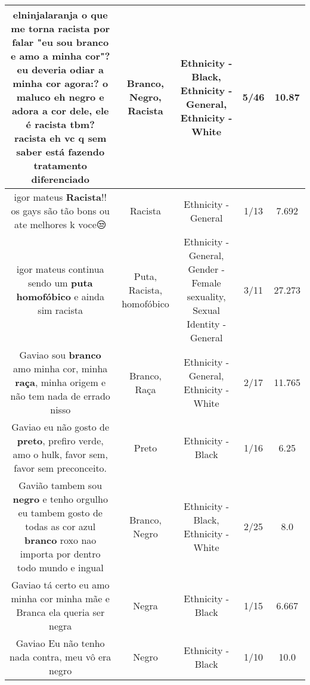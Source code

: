 \documentclass[11pt]{article}
\newlength\mylength
\begin{document}
\begin{center}
\begin{longtable}{|C{.65\mylength}|C{.30\mylength}|C{.12\mylength}|C{.12\mylength}|C{.12\mylength}|}
  \small elninjalaranja o que me torna \textbf{racista} por falar  "eu sou \textbf{branco} e amo a minha cor"? eu deveria odiar a minha cor agora:? o maluco eh \textbf{negro} e adora a cor dele, ele é \textbf{racista} tbm? \textbf{racista} eh vc q sem saber está fazendo tratamento diferenciado\normalsize   & Branco, Negro, Racista & Ethnicity - Black, Ethnicity - General, Ethnicity - White & 5/46 & 10.87 \\  \hline
  \small igor mateus  \textbf{Racista}!! os gays são tão bons ou ate melhores k voce😒\normalsize   & Racista & Ethnicity - General & 1/13 & 7.692 \\  \hline
  \small igor mateus continua sendo um \textbf{puta} \textbf{homofóbico} e ainda sim racista\normalsize   & Puta, Racista, homofóbico & Ethnicity - General, Gender - Female sexuality, Sexual Identity - General & 3/11 & 27.273 \\  \hline
  \small Gaviao sou \textbf{branco} amo minha cor, minha \textbf{raça}, minha origem e não tem nada de errado nisso\normalsize   & Branco, Raça & Ethnicity - General, Ethnicity - White & 2/17 & 11.765 \\  \hline
  \small Gaviao eu não gosto de \textbf{preto}, prefiro verde, amo o hulk, favor sem, favor sem preconceito.\normalsize   & Preto & Ethnicity - Black & 1/16 & 6.25 \\  \hline
  \small Gavião tambem sou \textbf{negro} e tenho orgulho eu tambem gosto de todas as cor azul \textbf{branco} roxo nao importa por dentro todo mundo e ingual\normalsize   & Branco, Negro & Ethnicity - Black, Ethnicity - White & 2/25 & 8.0 \\  \hline
  \small Gaviao tá certo eu amo minha cor minha mãe e Branca ela queria ser negra\normalsize   & Negra & Ethnicity - Black & 1/15 & 6.667 \\  \hline
  \small Gaviao Eu não tenho nada contra, meu vô era negro\normalsize   & Negro & Ethnicity - Black & 1/10 & 10.0 \\  \hline

\end{longtable}
\end{center}
\end{document}
